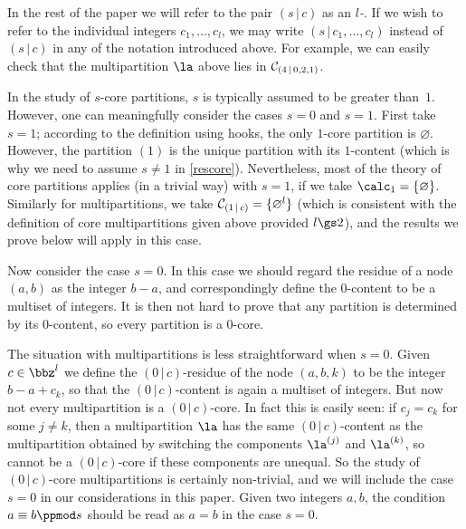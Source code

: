 \documentclass[a4paper, 11pt, twoside]{article}
\begin{document}
In the rest of the paper we will refer to the pair $(s\,|\,c)$ as an \emph{$l$-\mcd}. If we wish to refer to the individual integers $c_1,\dots,c_l$, we may write $(s\,|\,c_1,\dots,c_l)$ instead of $(s\,|\,c)$ in any of the notation introduced above. For example, we can easily check that the multipartition $\la$ above lies in $\mathcal{C}_{(4\,|\,0,2,1)}$.

\begin{rmksenum}
\item
In the study of $s$-core partitions, $s$ is typically assumed to be greater than~$1$. However, one can meaningfully consider the cases $s=0$ and $s=1$. First take $s=1$; according to the definition using hooks, the only $1$-core partition is $\varnothing$. However, the partition $(1)$ is the unique partition with its $1$-content (which is why we need to assume $s\neq1$ in \cref{rescore}). Nevertheless, most of the theory of core partitions applies (in a trivial way) with $s=1$, if we take $\cores1=\{\varnothing\}$. Similarly for multipartitions, we take $\mathcal{C}_{(1\,|\,c)}=\{\varnothing^l\}$ (which is consistent with the definition of core multipartitions given above provided $l\gs2$), and the results we prove below will apply in this case.

Now consider the case $s=0$. In this case we should regard the residue of a node $(a,b)$ as the integer $b-a$, and correspondingly define the $0$-content to be a multiset of integers. It is then not hard to prove that any partition is determined by its $0$-content, so every partition is a $0$-core.%

The situation with multipartitions is less straightforward when $s=0$.  Given $c\in\bbz^l$ we define the $(0\,|\,c)$-residue of the node $(a,b,k)$ to be the integer $b-a+c_k$, so that the $(0\,|\,c)$-content is again a multiset of integers. But now not every multipartition is a $(0\,|\,c)$-core. In fact this is easily seen: if $c_j=c_k$ for some $j\neq k$, then a multipartition $\la$ has the same $(0\,|\,c)$-content as the multipartition obtained by switching the components $\cpt\la j$ and $\cpt\la k$, so cannot be a $(0\,|\,c)$-core if these components are unequal. So the study of $(0\,|\,c)$-core multipartitions is certainly non-trivial, and we will include the case $s=0$ in our considerations in this paper. Given two integers $a,b$, the condition $a\equiv b\ppmod s$ should be read as $a=b$ in the case $s=0$.


\end{rmksenum}
\end{document}
